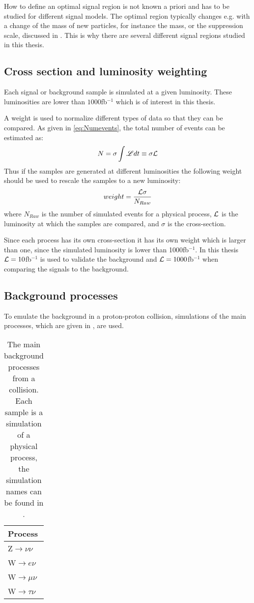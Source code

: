 How to define an optimal signal region is not known a priori and has to be studied for different signal models. The optimal region typically changes e.g. with a change of the mass of new particles, for instance the \abbrWIMP mass, or the suppression scale, discussed in . This is why there are several different signal regions studied in this thesis.

\subsection{Cross section and luminosity weighting}
Each signal or background sample is simulated at a given luminosity. These luminosities are lower than $1000$fb$^{-1}$ which is of interest in this thesis. 

A weight is used to normalize different types of data so that they can be compared. 
As given in \eqref{eq:Numevents}, the total number of events can be estimated as:
\begin{equation*}
N=\sigma \int \mathscr{L} dt \equiv \sigma \mathcal{L}
\end{equation*}
Thus if the samples are generated at different luminosities the following weight should be used to rescale the samples to a new luminosity:
\begin{equation}
weight=\frac{\mathcal{L} \sigma}{N_{Raw}}
\end{equation}
where $N_{Raw}$ is the number of simulated events for a physical process, $\mathcal{L}$ is the luminosity at which the samples are compared, and $\sigma$ is the cross-section. 

Since each process has its own cross-section it has its own weight which is larger than one, since the simulated luminosity is lower than 1000fb$^{-1}$.
In this thesis $\mathcal{L}=10$fb$^{-1}$ is used to validate the background and $\mathcal{L}=1000$fb$^{-1}$ when comparing the signals to the background.


\subsection{Background processes}
To emulate the background in a proton-proton collision, simulations of the main processes, which are given in , are used. 
\begin{table}[ht]
\begin{tabular}{|l|}
\hline
Process \\ \hline
Z$\rightarrow \nu \nu$ \\
W$\rightarrow e\nu$ \\
W$\rightarrow \mu \nu$ \\
W$\rightarrow \tau \nu$ \\ \hline
\end{tabular}
\caption{The main background processes from a collision. Each sample is a simulation of a physical process, the simulation names can be found in .}
\label{tab:backproc2}
\end{table}

